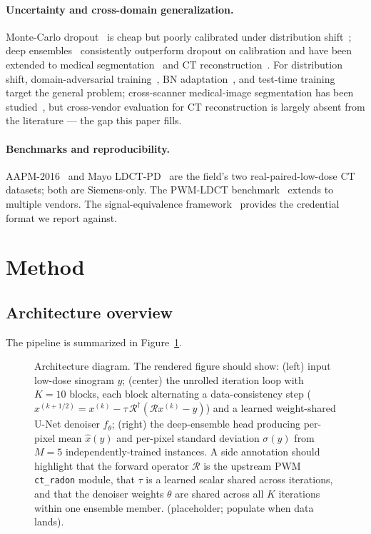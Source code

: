 \documentclass{article}  %
\newcommand{\todo}[1]{\textcolor{red}{\textbf{[TODO: #1]}}}
\newcommand{\todoFigure}[2]{%
  \begin{figure}[ht]\centering%
    \fbox{\parbox{0.85\linewidth}{\centering\todo{FIGURE: #2}}}%
    \caption{#2 (placeholder; populate when data lands).}\label{#1}%
  \end{figure}}
\begin{document}
\paragraph{Uncertainty and cross-domain generalization.} Monte-Carlo dropout~\citep{gal2016dropout} is cheap but poorly calibrated under distribution shift~\citep{ovadia2019uncertainty}; deep ensembles~\citep{lakshminarayanan2017deep} consistently outperform dropout on calibration and have been extended to medical segmentation~\citep{mehrtash2020confidence} and CT reconstruction~\citep{barbano2022uncertainty}. For distribution shift, domain-adversarial training~\citep{ganin2016domain}, BN adaptation~\citep{li2017revisiting}, and test-time training~\citep{sun2020ttt} target the general problem; cross-scanner medical-image segmentation has been studied~\citep{karani2018lifelong}, but cross-vendor evaluation for CT reconstruction is largely absent from the literature --- the gap this paper fills.

\paragraph{Benchmarks and reproducibility.} AAPM-2016~\citep{aapm2016challenge} and Mayo LDCT-PD~\citep{mccollough2020mayo} are the field's two real-paired-low-dose CT datasets; both are Siemens-only. The PWM-LDCT benchmark~\citep{ws1dataset} extends to multiple vendors. The signal-equivalence framework~\citep{ws2framework} provides the credential format we report against.

\section{Method}
\label{sec:method}

\subsection{Architecture overview}
\label{sec:method_overview}

The pipeline is summarized in Figure~\ref{fig:architecture}.

\todoFigure{fig:architecture}{Architecture diagram. The rendered figure should show: (left) input low-dose sinogram $y$; (center) the unrolled iteration loop with $K = 10$ blocks, each block alternating a data-consistency step ($x^{(k+1/2)} = x^{(k)} - \tau\, \mathcal{R}^\dagger(\mathcal{R} x^{(k)} - y)$) and a learned weight-shared U-Net denoiser $f_\theta$; (right) the deep-ensemble head producing per-pixel mean $\hat{x}(y)$ and per-pixel standard deviation $\sigma(y)$ from $M = 5$ independently-trained instances. A side annotation should highlight that the forward operator $\mathcal{R}$ is the upstream PWM \texttt{ct\_radon} module, that $\tau$ is a learned scalar shared across iterations, and that the denoiser weights $\theta$ are shared across all $K$ iterations within one ensemble member.}
\end{document}
